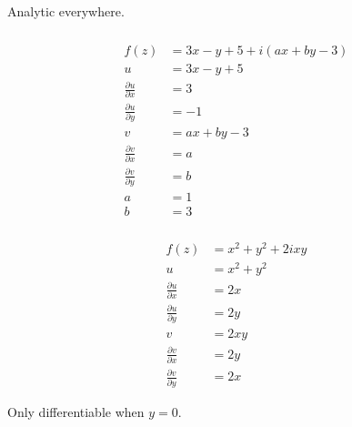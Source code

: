 \documentclass{article}
\begin{document}
Analytic everywhere.

\setcounter{subsubsection}{14}
\subsubsection{}

\begin{align*}
  f(z)                          & = 3 x - y + 5 + i (a x + b y - 3) \\
  u                             & = 3 x - y + 5                     \\
  \frac{\partial u}{\partial x} & = 3                               \\
  \frac{\partial u}{\partial y} & = -1                              \\
  v                             & = a x + b y - 3                   \\
  \frac{\partial v}{\partial x} & = a                               \\
  \frac{\partial v}{\partial y} & = b                               \\
  a                             & = 1                               \\
  b                             & = 3
\end{align*}

\setcounter{subsubsection}{16}
\subsubsection{}

\begin{align*}
  f(z)                          & = x^2 + y^2 + 2 i x y \\
  u                             & = x^2 + y^2           \\
  \frac{\partial u}{\partial x} & = 2 x                 \\
  \frac{\partial u}{\partial y} & = 2 y                 \\
  v                             & = 2 x y               \\
  \frac{\partial v}{\partial x} & = 2 y                 \\
  \frac{\partial v}{\partial y} & = 2 x
\end{align*}

Only differentiable when $y = 0$.

\setcounter{subsubsection}{18}
\subsubsection{}
\end{document}
